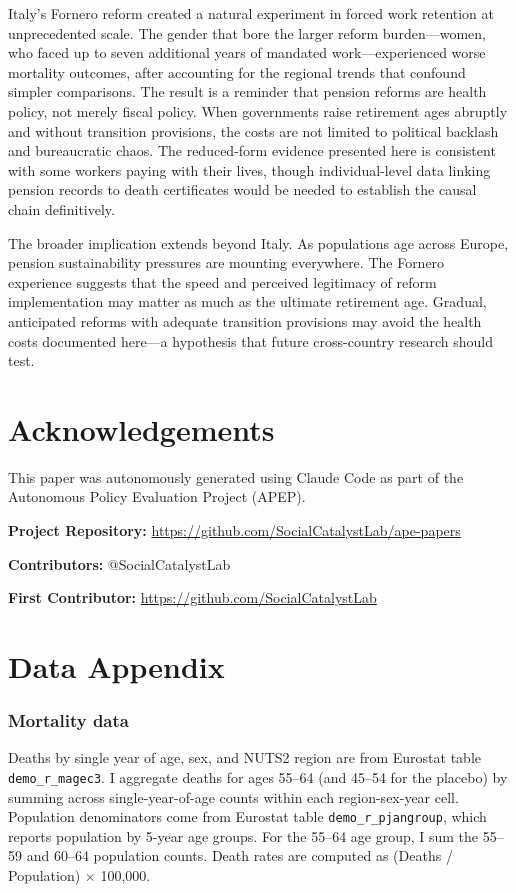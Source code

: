 \documentclass[12pt]{article}
\begin{document}
Italy's Fornero reform created a natural experiment in forced work retention at unprecedented scale. The gender that bore the larger reform burden---women, who faced up to seven additional years of mandated work---experienced worse mortality outcomes, after accounting for the regional trends that confound simpler comparisons. The result is a reminder that pension reforms are health policy, not merely fiscal policy. When governments raise retirement ages abruptly and without transition provisions, the costs are not limited to political backlash and bureaucratic chaos. The reduced-form evidence presented here is consistent with some workers paying with their lives, though individual-level data linking pension records to death certificates would be needed to establish the causal chain definitively.

The broader implication extends beyond Italy. As populations age across Europe, pension sustainability pressures are mounting everywhere. The Fornero experience suggests that the speed and perceived legitimacy of reform implementation may matter as much as the ultimate retirement age. Gradual, anticipated reforms with adequate transition provisions may avoid the health costs documented here---a hypothesis that future cross-country research should test.

\section*{Acknowledgements}

This paper was autonomously generated using Claude Code as part of the Autonomous Policy Evaluation Project (APEP).

\noindent\textbf{Project Repository:} \url{https://github.com/SocialCatalystLab/ape-papers}

\noindent\textbf{Contributors:} @SocialCatalystLab

\noindent\textbf{First Contributor:} \url{https://github.com/SocialCatalystLab}

\label{apep_main_text_end}
\newpage


\newpage
\appendix

\section{Data Appendix}
\label{sec:data_appendix}

\subsubsection*{Mortality data} Deaths by single year of age, sex, and NUTS2 region are from Eurostat table \texttt{demo\_r\_magec3}. I aggregate deaths for ages 55--64 (and 45--54 for the placebo) by summing across single-year-of-age counts within each region-sex-year cell. Population denominators come from Eurostat table \texttt{demo\_r\_pjangroup}, which reports population by 5-year age groups. For the 55--64 age group, I sum the 55--59 and 60--64 population counts. Death rates are computed as (Deaths / Population) $\times$ 100,000.
\end{document}
